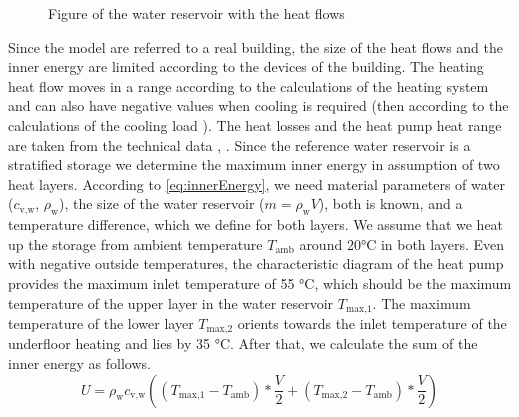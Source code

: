     \begin{figure}[H]
        \centering
        \def\svgwidth{120pt}
        
        \caption{Figure of the water reservoir with the heat flows}
        \label{fig:Figure of the water reservoir with the heat flows}
    \end{figure}
    Since the model are referred to a real building, the size of the heat flows and the inner energy are limited according to the devices of the building. The heating heat flow moves in a range according to the calculations of the heating system \cite{Roth_Auslegung.2020} and can also have negative values when cooling is required (then according to the calculations of the cooling load \cite{SEFIngenieurgesellschaftMBH.2019}). The heat losses and the heat pump heat range are taken from the technical data \cite{Oskar}, \cite{TUM}.\newline
    Since the reference water reservoir is a stratified storage we determine the maximum inner energy in assumption of two heat layers. According to \autoref{eq:innerEnergy}, we need material parameters of water ($c_\text{v,w}$, $\rho_\text{w}$), the size of the water reservoir ($m = \rho_\text{w} V$), both is known, and a temperature difference, which we define for both layers. We assume that we heat up the storage from ambient temperature $T_\text{amb}$ around 20°C in both layers. Even with negative outside temperatures, the characteristic diagram of the heat pump provides the maximum inlet temperature of 55 °C, which should be the maximum temperature of the upper layer in the water reservoir $T_\text{max,1}$. The maximum temperature of the lower layer $T_\text{max,2}$ orients towards the inlet temperature of the underfloor heating and lies by 35 °C. After that, we calculate the sum of the inner energy as follows.
    \begin{equation}
        \label{eq:max.Energie}
        U = \rho_\text{w} c_\text{v,w} ((T_\text{max,1}-T_\text{amb})*\frac{V}{2} + (T_\text{max,2}-T_\text{amb})*\frac{V}{2}) 
    \end{equation}

